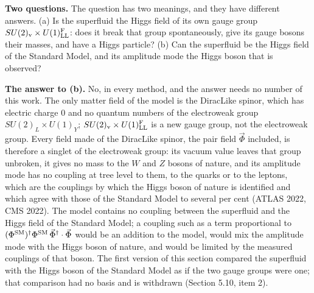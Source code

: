 \documentclass[
  10pt,
]{article}
\begin{document}
\textbf{Two questions.} The question has two meanings, and they have
different answers. (a) Is the superfluid the Higgs field of its own
gauge group \(SU(2)_{\rm v}\times U(1)^{\rm F}_{\rm LL}\): does it break
that group spontaneously, give its gauge bosons their masses, and have a
Higgs particle? (b) Can the superfluid be the Higgs field of the
Standard Model, and its amplitude mode the Higgs boson that is observed?

\textbf{The answer to (b).} No, in every method, and the answer needs no
number of this work. The only matter field of the model is the DiracLike
spinor, which has electric charge 0 and no quantum numbers of the
electroweak group \(SU(2)_L\times U(1)_Y\);
\(SU(2)_{\rm v}\times U(1)^{\rm F}_{\rm LL}\) is a new gauge group, not
the electroweak group. Every field made of the DiracLike spinor, the
pair field \(\vec\Phi\) included, is therefore a singlet of the
electroweak group: its vacuum value leaves that group unbroken, it gives
no mass to the \(W\) and \(Z\) bosons of nature, and its amplitude mode
has no coupling at tree level to them, to the quarks or to the leptons,
which are the couplings by which the Higgs boson of nature is identified
and which agree with those of the Standard Model to several per cent
(ATLAS 2022, CMS 2022). The model contains no coupling between the
superfluid and the Higgs field of the Standard Model; a coupling such as
a term proportional to
\((\Phi^{\rm SM})^\dagger\Phi^{\rm SM}\,\vec\Phi^\dagger\cdot\vec\Phi\)
would be an addition to the model, would mix the amplitude mode with the
Higgs boson of nature, and would be limited by the measured couplings of
that boson. The first version of this section compared the superfluid
with the Higgs boson of the Standard Model as if the two gauge groups
were one; that comparison had no basis and is withdrawn (Section 5.10,
item 2).
\end{document}
